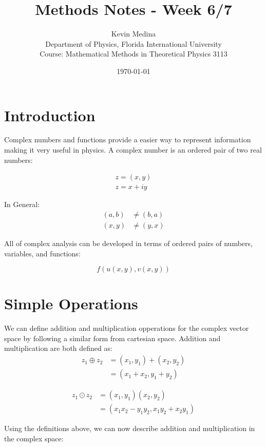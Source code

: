 \documentclass[12pt]{article}
\title{Methods Notes - Week 6/7}
\author{Kevin Medina \\
        Department of Physics, Florida International University \\
        Course: Mathematical Methods in Theoretical Physics 3113}
\date{\today}
\begin{document}
\maketitle

\section{Introduction}
Complex numbers and functions provide a easier way to represent information making it very useful in physics. A complex number is an ordered pair of two real numbers:

\begin{align*}
	z = (x,y) \\
	z = x+iy
\end{align*}


In General:
\begin{align*}
  (a,b) &\neq (b,a) \\
  (x,y) &\neq (y,x)
\end{align*}

All of complex analysis can be developed in terms of ordered pairs of numbers, variables, and functions:

\begin{equation}
	f(u(x,y),v(x,y))
\end{equation}

\section{Simple Operations}
We can define addition and multiplication opperations for the complex vector space by following a similar form from cartesian space. Addition and multiplication are both defined as:
\begin{equation}
\begin{aligned}
	z_1 \oplus z_2 
	&=(x_1,y_1)+ (x_2,y_2) \\
	&=(x_1+x_2,y_1+y_2)
\end{aligned}
\end{equation}

\begin{equation}
\begin{aligned}
	z_1 \odot z_2 
	&=(x_1, y_1)(x_2,y_2) \\
	&=(x_1 x_2 - y_1 y_2, x_1 y_2 + x_2 y_1) 
\end{aligned}
\end{equation}

Using the definitions above, we can now describe addition and multiplication in the complex space:
\end{document}
